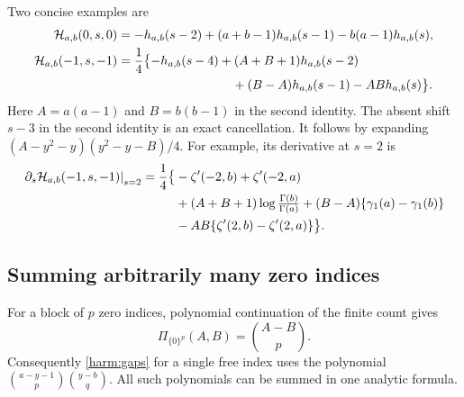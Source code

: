 Two concise examples are
\begin{align}
 \mathcal H_{a,b}(0,s,0)
   &=-h_{a,b}(s-2)+(a+b-1)h_{a,b}(s-1)
                                  -b(a-1)h_{a,b}(s),
 \label{harm:examplezero}\\
 \mathcal H_{a,b}(-1,s,-1)
   &=\frac14\bigl\{-h_{a,b}(s-4)
       +(A+B+1)h_{a,b}(s-2)\notag\\
   &\hspace{32mm}+(B-A)h_{a,b}(s-1)-ABh_{a,b}(s)\bigr\}.
 \label{harm:exampleone}
\end{align}
Here $A=a(a-1)$ and $B=b(b-1)$ in the second identity.
The absent shift $s-3$ in the second identity is an exact cancellation.
It follows by expanding
$(A-y^2-y)(y^2-y-B)/4$. For example, its derivative at $s=2$ is
\begin{align}
 \left.\partial_s\mathcal H_{a,b}(-1,s,-1)\right|_{s=2}
  =\frac14\bigl\{&-\zeta'(-2,b)+\zeta'(-2,a)\notag\\
       &+(A+B+1)\log\tfrac{\Gamma(b)}{\Gamma(a)}
        +(B-A)\{\gamma_1(a)-\gamma_1(b)\}\notag\\
       &-AB\{\zeta'(2,b)-\zeta'(2,a)\}\bigr\}.
 \label{harm:examplejet}
\end{align}

\subsection{Summing arbitrarily many zero indices}

For a block of $p$ zero indices, polynomial continuation of the finite
count gives
\begin{equation}
                    \Pi_{\{0\}^p}(A,B)=\binom{A-B}{p}.
 \label{harm:zeroblock}
\end{equation}
Consequently \eqref{harm:gaps} for a single free index uses the polynomial
$\binom{a-y-1}{p}\binom{y-b}{q}$. All such polynomials can be summed
in one analytic formula.

